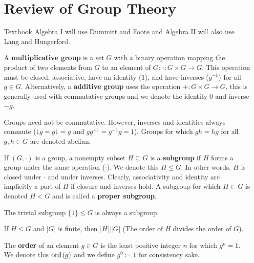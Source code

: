 \section{Review of Group Theory}
\begin{note}{Textbook}
	Algebra I will use Dummitt and Foote and Algebra II will also use Lang and Hungerford.
\end{note}
\begin{definition}[Group]
	A \textbf{multiplicative group} is a set $G$ with a binary operation mapping the product of two elements from $G$ to an element of $G$: $\cdot : G \times G \to G$. This operation must be closed, associative, have an identity ($1$), and have inverses ($g^{-1}$) for all $g \in G$. Alternatively, a \textbf{additive group} uses the operation $+: G\times G \to G$, this is generally used with commutative groups and we denote the identity $0$ and inverse $-g$.
\end{definition}
\begin{remark}[Commutatitvity]
	Groups need not be commutative. However, inverses and identities always commute ($1g = g 1 = g$ and $g g^{-1}= g^{-1}g = 1$). Groups for which $gh = hg$ for all $g, h \in G$ are denoted abelian.
\end{remark}
\begin{definition}[Subgroup]
	If $(G, \cdot )$ is a group, a nonempty subset $H \subseteq G$ is a \textbf{subgroup} if $H$ forms a group under the same operation ($\cdot$). We denote this $H\le G$. In other words, $H$ is closed under $\cdot$ and under inverses. Clearly, associativity and identity are implicitly a part of $H$ if closure and inverses hold. A subgroup for which $H\subset G$ is denoted  $H <  G$ and is called a \textbf{proper subgroup}.
\end{definition}
\begin{example}
	The trivial subgroup $ \{1\} \le G$ is always a subgroup.
\end{example}
\begin{theorem}
	If $H\le G$ and $\left| G \right| $ is finite, then $\left| H \right| | \left| G \right| $ (The order of $H$ divides the order of $G$).
\end{theorem}
\begin{definition}[Order]
	The \textbf{order} of an element $g \in G$ is the least positive integer $n$ for which $g^{n} = 1$. We denote this $\operatorname{ord} \left( g \right) $ and we define $g^{0} \coloneqq 1$ for consistency sake.
\end{definition}
